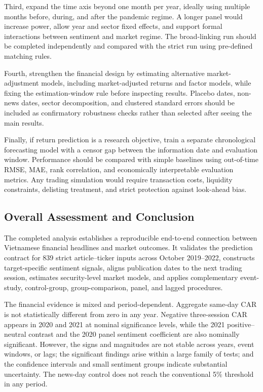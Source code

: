 Third, expand the time axis beyond one month per year, ideally using multiple months before, during, and after the pandemic regime. A longer panel would increase power, allow year and sector fixed effects, and support formal interactions between sentiment and market regime. The broad-linking run should be completed independently and compared with the strict run using pre-defined matching rules.

Fourth, strengthen the financial design by estimating alternative market-adjustment models, including market-adjusted returns and factor models, while fixing the estimation-window rule before inspecting results. Placebo dates, non-news dates, sector decomposition, and clustered standard errors should be included as confirmatory robustness checks rather than selected after seeing the main results.

Finally, if return prediction is a research objective, train a separate chronological forecasting model with a censor gap between the information date and evaluation window. Performance should be compared with simple baselines using out-of-time RMSE, MAE, rank correlation, and economically interpretable evaluation metrics. Any trading simulation would require transaction costs, liquidity constraints, delisting treatment, and strict protection against look-ahead bias.

\subsection{Overall Assessment and Conclusion}
\label{subsec:conclusion-statistical}

The completed analysis establishes a reproducible end-to-end connection between Vietnamese financial headlines and market outcomes. It validates the prediction contract for 839 strict article--ticker inputs across October 2019--2022, constructs target-specific sentiment signals, aligns publication dates to the next trading session, estimates security-level market models, and applies complementary event-study, control-group, group-comparison, panel, and lagged procedures.

The financial evidence is mixed and period-dependent. Aggregate same-day CAR is not statistically different from zero in any year. Negative three-session CAR appears in 2020 and 2021 at nominal significance levels, while the 2021 positive--neutral contrast and the 2020 panel sentiment coefficient are also nominally significant. However, the signs and magnitudes are not stable across years, event windows, or lags; the significant findings arise within a large family of tests; and the confidence intervals and small sentiment groups indicate substantial uncertainty. The news-day control does not reach the conventional 5\% threshold in any period.

